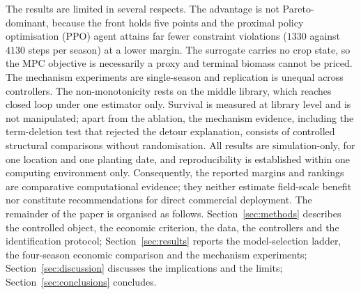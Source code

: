 The results are limited in several respects. The advantage is not Pareto-dominant,
because the front holds five points and the proximal policy optimisation (PPO) agent
attains far fewer constraint violations ($1330$ against $4130$ steps per season) at a
lower margin. The surrogate carries no crop state, so the MPC objective is necessarily a
proxy and terminal biomass cannot be priced. The mechanism experiments are single-season
and replication is unequal across controllers. The non-monotonicity rests on the middle
library, which reaches closed loop under one estimator only. Survival is measured at
library level and is not manipulated; apart from the ablation, the mechanism evidence,
including the term-deletion test that rejected the detour explanation, consists of
controlled structural comparisons without randomisation.
All results are simulation-only, for one location and one planting date, and
reproducibility is established within one computing environment only. Consequently, the
reported margins and rankings are comparative computational evidence; they neither
estimate field-scale benefit nor constitute recommendations for direct commercial
deployment.
The remainder of
the paper is organised as follows. Section~\ref{sec:methods} describes the controlled
object, the economic criterion, the data, the controllers and the identification
protocol; Section~\ref{sec:results} reports the model-selection ladder, the four-season
economic comparison and the mechanism experiments; Section~\ref{sec:discussion} discusses
the implications and the limits; Section~\ref{sec:conclusions} concludes.


